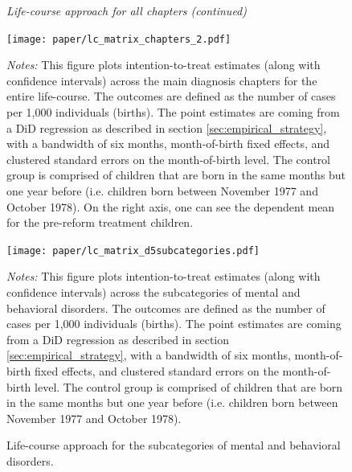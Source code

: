 \documentclass[11pt, a4paper]{article} %
\begin{document}
\begin{figure}[H]\centering
		\begin{minipage}{\linewidth}\scriptsize
		\begin{center} \emph{Life-course approach for all chapters (continued)}\end{center}
	\end{minipage}
	\texttt{[image: paper/lc\_matrix\_chapters\_2.pdf]}
		\begin{minipage}{\linewidth}
		\scriptsize \emph{Notes:} This figure plots intention-to-treat estimates (along with confidence intervals) across the main diagnosis chapters for the entire life-course. The outcomes are defined as the number of cases per 1,000 individuals (births). The point estimates are coming from a DiD regression as described in section \ref{sec:empirical_strategy}, with a bandwidth of six months, month-of-birth fixed effects, and clustered standard errors on the month-of-birth level. The control group is comprised of children that are born in the same months but one year before (i.e. children born between November 1977 and October 1978). On the right axis, one can see the dependent mean for the pre-reform treatment children.
	\end{minipage}
\end{figure}
\begin{figure}[H]\centering
	\caption{Life-course approach for the subcategories of mental and behavioral disorders.}\label{fig: appendix_lc_matrix_d5_subcateg}
	\texttt{[image: paper/lc\_matrix\_d5subcategories.pdf]}
		\begin{minipage}{\linewidth}
		\scriptsize \emph{Notes:} This figure plots intention-to-treat estimates (along with confidence intervals) across the subcategories of mental and behavioral disorders. The outcomes are defined as the number of cases per 1,000 individuals (births). The point estimates are coming from a DiD regression as described in section \ref{sec:empirical_strategy}, with a bandwidth of six months, month-of-birth fixed effects, and clustered standard errors on the month-of-birth level. The control group is comprised of children that are born in the same months but one year before (i.e. children born between November 1977 and October 1978).
	\end{minipage}
\end{figure}

\renewcommand\thetable{A\arabic{table}}
\setcounter{table}{0} 
\end{document}
